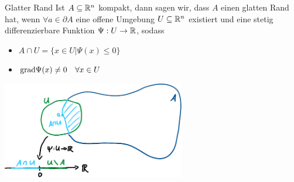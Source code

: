 \newpage 
\begin{Def}{Glatter Rand}
    Ist $A\subseteq \mathbb{R}^n$ kompakt, dann sagen wir, dass $A$ einen glatten Rand hat, wenn $\forall a\in \partial A$  eine offene Umgebung $U\subseteq \mathbb{R}^n$ existiert und eine stetig differenzierbare Funktion $\Psi: U\rightarrow \mathbb{R}$, sodass 
    \begin{itemize}
        \item $A\cap U = \{x\in U | \Psi(x)\leq 0\}$
        \item $\text{grad} \Psi(x) \neq 0 \quad \forall x \in U$
    \end{itemize}
       \begin{center}
    \includegraphics[width=0.6\textwidth]{Dateien/Glatter_Rand.pdf}
\end{center}
\end{Def}
